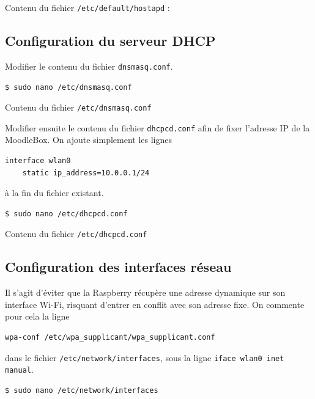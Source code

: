 \documentclass[11pt]{article}
\begin{document}
Contenu du fichier \lstinline{/etc/default/hostapd} :



\subsection{Configuration du serveur DHCP}

Modifier le contenu du fichier \lstinline{dnsmasq.conf}.

\begin{lstlisting}[language=bash]
$ sudo nano /etc/dnsmasq.conf
\end{lstlisting}

Contenu du fichier \lstinline{/etc/dnsmasq.conf}



Modifier ensuite le contenu du fichier \lstinline{dhcpcd.conf} afin de fixer l'adresse IP de la MoodleBox. On ajoute simplement les lignes
\begin{lstlisting}[language=bash]
interface wlan0
    static ip_address=10.0.0.1/24
\end{lstlisting}
à la fin du fichier existant.

\begin{lstlisting}[language=bash]
$ sudo nano /etc/dhcpcd.conf
\end{lstlisting}

Contenu du fichier \lstinline{/etc/dhcpcd.conf}




\subsection{Configuration des interfaces réseau}

Il s'agit d'éviter que la Raspberry récupère une adresse dynamique sur son interface Wi-Fi, risquant d'entrer en conflit avec son adresse fixe. On commente pour cela la ligne
\begin{lstlisting}[language=bash]
wpa-conf /etc/wpa_supplicant/wpa_supplicant.conf
\end{lstlisting}
dans le fichier \lstinline{/etc/network/interfaces}, sous la ligne \lstinline{iface wlan0 inet manual}.

\begin{lstlisting}[language=bash]
$ sudo nano /etc/network/interfaces
\end{lstlisting}
\end{document}
